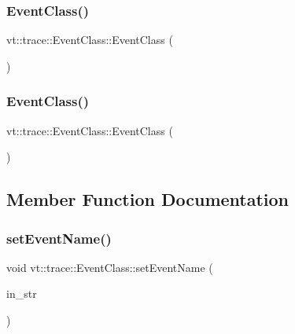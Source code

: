 \subsubsection{\texorpdfstring{Event\+Class()}{EventClass()}\hspace{0.1cm}{\footnotesize\ttfamily [2/3]}}
{\footnotesize\ttfamily vt\+::trace\+::\+Event\+Class\+::\+Event\+Class (\begin{DoxyParamCaption}\item[{\hyperlink{structvt_1_1trace_1_1_event_class}{Event\+Class} const \&}]{ }\end{DoxyParamCaption})\hspace{0.3cm}{\ttfamily [default]}}

\mbox{\label{structvt_1_1trace_1_1_event_class_ad33692ab53379c2fa9b54a9b8d389c69}} 
\subsubsection{\texorpdfstring{Event\+Class()}{EventClass()}\hspace{0.1cm}{\footnotesize\ttfamily [3/3]}}
{\footnotesize\ttfamily vt\+::trace\+::\+Event\+Class\+::\+Event\+Class (\begin{DoxyParamCaption}\item[{\hyperlink{structvt_1_1trace_1_1_event_class}{Event\+Class} \&\&}]{ }\end{DoxyParamCaption})\hspace{0.3cm}{\ttfamily [default]}}



\subsection{Member Function Documentation}
\mbox{\label{structvt_1_1trace_1_1_event_class_a853195e5cf52ac0214ff3863218bde81}} 
\subsubsection{\texorpdfstring{set\+Event\+Name()}{setEventName()}}
{\footnotesize\ttfamily void vt\+::trace\+::\+Event\+Class\+::set\+Event\+Name (\begin{DoxyParamCaption}\item[{std\+::string const \&}]{in\+\_\+str }\end{DoxyParamCaption})}

